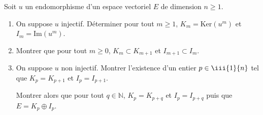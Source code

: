 \documentclass[a4paper,twoside,french,11pt]{VcCours}
\begin{document}
\begin{Exercice}{}
Soit $u$ un endomorphisme d'un espace vectoriel $E$ de dimension $n \geq 1$.
\begin{enumerate}
\item On suppose $u$ injectif. Déterminer pour tout $m \geq 1$, $K_m = \textrm{Ker}(u^m)$ et $I_m = \textrm{Im}(u^m)$.
\item Montrer que pour tout $m \geq 0$, $K_m \subset K_{m+1}$ et $I_{m+1} \subset I_m$.
\item On suppose $u$ non injectif. Montrer l'existence d'un entier $p \in \iii{1}{n}$ tel que $K_p=K_{p+1}$ et $I_p = I_{p+1}$.

\noindent Montrer alors que pour tout $q \in \mathbb{N}$, $K_p = K_{p+q}$ et $I_p = I_{p+q}$ puis que $E = K_p \oplus I_p$.
\end{enumerate}
\end{Exercice} 
\end{document}
